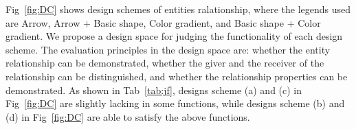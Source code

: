 \documentclass[review,journal]{vgtc}         %
\begin{document}
Fig~\ref{fig:DC} shows design schemes of entities ralationship, where the legends used are Arrow, Arrow + Basic shape, Color gradient, and Basic shape + Color gradient. We propose a design space for judging the functionality of each design scheme. The evaluation principles in the design space are:  whether the entity relationship can be demonstrated,  whether the giver and the receiver of the relationship can be distinguished, and  whether the relationship properties can be demonstrated. As shown in Tab~\ref{tab:jf}, designs scheme (a) and (c) in Fig~\ref{fig:DC} are slightly lacking in some functions, while designs scheme (b) and (d) in  Fig~\ref{fig:DC} are able to satisfy the above functions.
\end{document}
